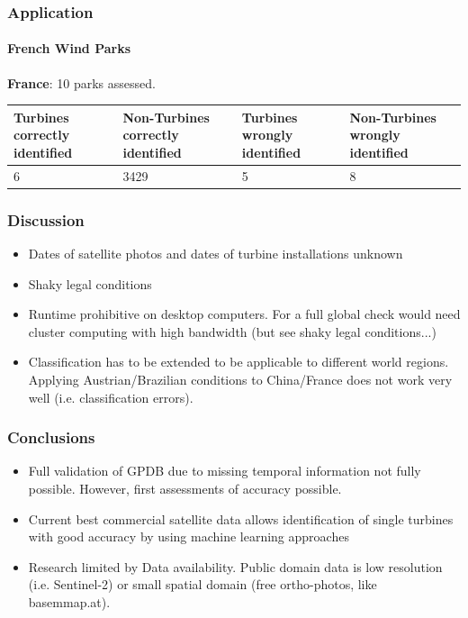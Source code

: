 \documentclass[color=usenames,dvipsnames]{beamer}
\begin{document}
\begin{frame}
\frametitle{Application}
\framesubtitle{French Wind Parks}

\textbf{France}: 10 parks assessed. 

\begin{table}[]
	\begin{tabularx}{\textwidth}{XXXX}
	
		Turbines correctly identified  &Non-Turbines correctly identified  &Turbines wrongly identified  &Non-Turbines wrongly identified  \\
			\hline
		6  &3429  &5  &8  \\
	\end{tabularx}
\end{table}

\end{frame}

\begin{frame}
\frametitle{Discussion}
\begin{itemize}
 \item Dates of satellite photos and dates of turbine installations unknown
 \item Shaky legal conditions
 \item Runtime prohibitive on desktop computers. For a full global check would need cluster computing with high bandwidth (but see shaky legal conditions...) 
 \item Classification has to be extended to be applicable to different world regions. Applying Austrian/Brazilian conditions to China/France does not work very well (i.e. classification errors).
\end{itemize}

\end{frame}




\begin{frame}
\frametitle{Conclusions}
\begin{itemize}
 \item Full validation of GPDB due to missing temporal information not fully possible. However, first assessments of accuracy possible.
 \item Current best commercial satellite data allows identification of single turbines with good accuracy by using machine learning approaches
 \item Research limited by Data availability. Public domain data is low resolution (i.e. Sentinel-2) or small spatial domain (free ortho-photos, like basemmap.at).
\end{itemize}

\end{frame}
\end{document}
